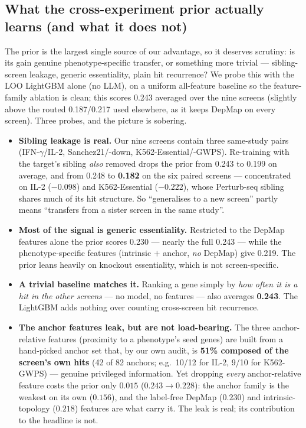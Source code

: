\documentclass[11pt]{article}
\begin{document}
\subsection*{What the cross-experiment prior actually learns (and what it does not)}

The prior is the largest single source of our advantage, so it deserves scrutiny: is its gain genuine
phenotype-specific transfer, or something more trivial --- sibling-screen leakage, generic essentiality,
plain hit recurrence? We probe this with the LOO LightGBM alone (no LLM), on a uniform all-feature
baseline so the feature-family ablation is clean; this scores 0.243 averaged over the nine screens
(slightly above the routed 0.187/0.217 used elsewhere, as it keeps DepMap on every screen). Three probes,
and the picture is sobering.

\begin{itemize}\itemsep3pt
  \item \textbf{Sibling leakage is real.} Our nine screens contain three same-study pairs
  (IFN-$\gamma$/IL-2, Sanchez21/-down, K562-Essential/-GWPS). Re-training with the target's sibling
  \emph{also} removed drops the prior from 0.243 to 0.199 on average, and from 0.248 to \textbf{0.182}
  on the six paired screens --- concentrated on IL-2 ($-0.098$) and K562-Essential ($-0.222$), whose
  Perturb-seq sibling shares much of its hit structure. So ``generalises to a new screen'' partly means
  ``transfers from a sister screen in the same study''.
  \item \textbf{Most of the signal is generic essentiality.} Restricted to the DepMap features alone the
  prior scores 0.230 --- nearly the full 0.243 --- while the phenotype-specific features
  (intrinsic $+$ anchor, \emph{no} DepMap) give 0.219. The prior leans heavily on knockout essentiality,
  which is not screen-specific.
  \item \textbf{A trivial baseline matches it.} Ranking a gene simply by \emph{how often it is a hit in
  the other screens} --- no model, no features --- also averages \textbf{0.243}. The LightGBM adds
  nothing over counting cross-screen hit recurrence.
  \item \textbf{The anchor features leak, but are not load-bearing.} The three anchor-relative features
  (proximity to a phenotype's seed genes) are built from a hand-picked anchor set that, by our own audit,
  is \textbf{51\% composed of the screen's own hits} (42 of 82 anchors; e.g.\ 10/12 for IL-2, 9/10 for
  K562-GWPS) --- genuine privileged information. Yet dropping \emph{every} anchor-relative feature costs
  the prior only $0.015$ ($0.243\!\rightarrow\!0.228$): the anchor family is the weakest on its own
  ($0.156$), and the label-free DepMap ($0.230$) and intrinsic-topology ($0.218$) features are what carry
  it. The leak is real; its contribution to the headline is not.
\end{itemize}
\end{document}
